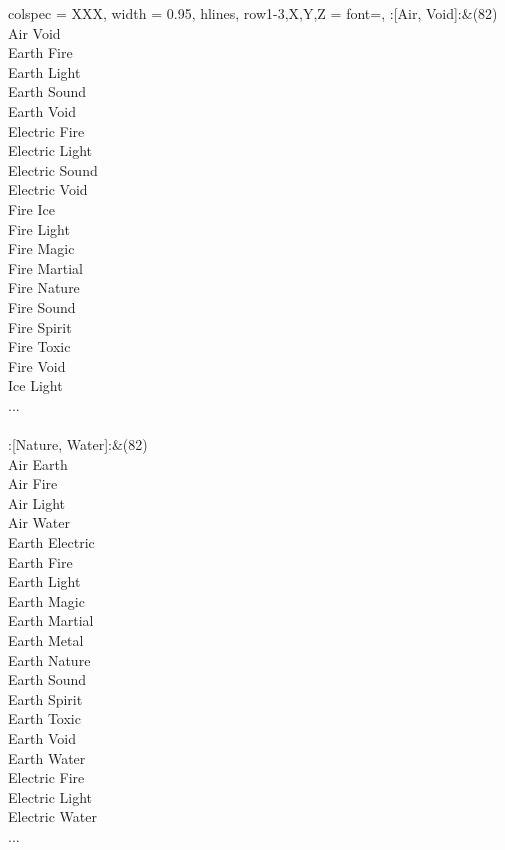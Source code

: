 \begin{longtblr}[
	caption = {2v2 Attacking Effective},
	label = {2v2-Attacking-Effective},
]{
	colspec = {XXX}, width = 0.95\linewidth,
	hlines,
	row{1-3,X,Y,Z} = {font=\bfseries},
}
	:[Air, Void]:&{(82)\\
	Air Void \\
	Earth Fire \\
	Earth Light \\
	Earth Sound \\
	Earth Void \\
	Electric Fire \\
	Electric Light \\
	Electric Sound \\
	Electric Void \\
	Fire Ice \\
	Fire Light \\
	Fire Magic \\
	Fire Martial \\
	Fire Nature \\
	Fire Sound \\
	Fire Spirit \\
	Fire Toxic \\
	Fire Void \\
	Ice Light \\
	...\\
	}\\

	:[Nature, Water]:&{(82)\\
	Air Earth \\
	Air Fire \\
	Air Light \\
	Air Water \\
	Earth Electric \\
	Earth Fire \\
	Earth Light \\
	Earth Magic \\
	Earth Martial \\
	Earth Metal \\
	Earth Nature \\
	Earth Sound \\
	Earth Spirit \\
	Earth Toxic \\
	Earth Void \\
	Earth Water \\
	Electric Fire \\
	Electric Light \\
	Electric Water \\
	...\\
	}\\


\end{longtblr}
